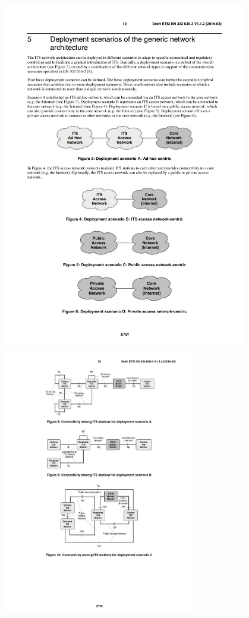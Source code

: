 \begin{figure}
	\includegraphics[width=0.95\textwidth]{content/images/02_architektur/netzwerkSzenario.pdf}
	\includegraphics[width=0.75\textwidth]{content/images/02_architektur/verbindungenNetzwerkSzenario.pdf}

\end{figure}
